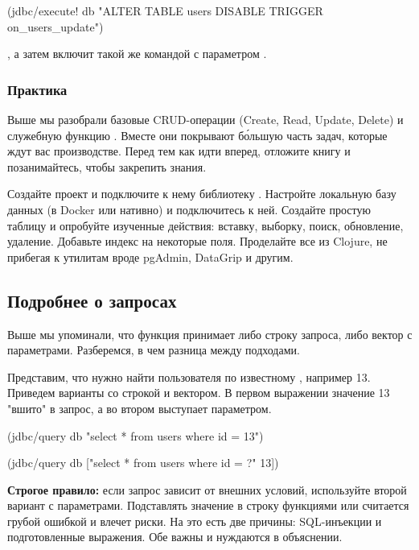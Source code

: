 \begin{english}
  \begin{clojure}
(jdbc/execute! db "ALTER TABLE users DISABLE TRIGGER on_users_update")
  \end{clojure}
\end{english}

\noindent
, а затем включит такой же командой с параметром .

\subsubsection{Практика}

Выше мы разобрали базовые CRUD-операции (Create, Read, Update, Delete) и служебную функцию . Вместе они покрывают б\'{о}льшую часть задач, которые ждут вас производстве. Перед тем как идти вперед, отложите книгу и позанимайтесь, чтобы закрепить знания.

Создайте проект и подключите к нему библиотеку . Настройте локальную базу данных (в Docker или нативно) и подключитесь к ней. Создайте простую таблицу и опробуйте изученные действия: вставку, выборку, поиск, обновление, удаление. Добавьте индекс на некоторые поля. Проделайте все из Clojure, не прибегая к утилитам вроде pgAdmin, DataGrip и другим.

\subsection{Подробнее о запросах}

Выше мы упоминали, что функция  принимает либо строку запроса, либо вектор с параметрами. Разберемся, в чем разница между подходами.

Представим, что нужно найти пользователя по известному , например 13. Приведем варианты со строкой и вектором. В первом выражении значение 13 "вшито" в запрос, а во втором выступает параметром.

\begin{english}
  \begin{clojure}
(jdbc/query db "select * from users where id = 13")

(jdbc/query db ["select * from users where id = ?" 13])
  \end{clojure}
\end{english}

\textbf{Строгое правило:} если запрос зависит от внешних условий, используйте второй вариант с параметрами. Подставлять значение в строку функциями  или  считается грубой ошибкой и влечет риски. На это есть две причины: SQL-инъекции и подготовленные выражения. Обе важны и нуждаются в объяснении.

